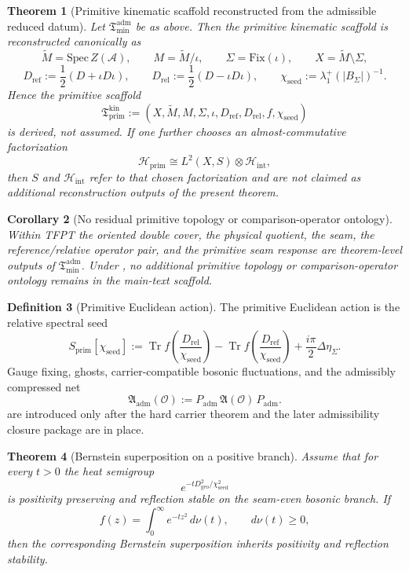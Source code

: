 \documentclass[11pt,a4paper]{article}
\newtheorem{theorem}{Theorem}[section]
\newtheorem{corollary}[theorem]{Corollary}
\theoremstyle{definition}
\newtheorem{definition}[theorem]{Definition}
\theoremstyle{remark}
\DeclareMathOperator{\tr}{Tr}
\newcommand{\Seam}{\Sigma}
\newcommand{\inv}{\iota}
\newcommand{\Hint}{\mathcal H_{\mathrm{int}}}
\newcommand{\Tmin}{\mathfrak T_{\mathrm{min}}}
\newcommand{\Tprim}{\mathfrak T_{\mathrm{prim}}}
\newcommand{\chiseed}{\chi_{\mathrm{seed}}}
\newcommand{\Padm}{P_{\mathrm{adm}}}
\begin{document}
\begin{theorem}[Primitive kinematic scaffold reconstructed from the admissible reduced datum]
\label{thm:primitive-datum-from-reduced-datum}
\label{thm:primitive-scaffold-from-reduced-datum}
Let $\Tmin^{\mathrm{adm}}$ be as above. Then the primitive kinematic scaffold is reconstructed
canonically as
\[
\widetilde M=\mathrm{Spec}\,Z(\mathcal A),\qquad
M=\widetilde M/\inv,\qquad
\Seam=\mathrm{Fix}(\inv),\qquad
X=\widetilde M\setminus \Seam,
\]
\[
D_{\mathrm{ref}}:=\frac12(D+\inv D\inv),\qquad
D_{\mathrm{rel}}:=\frac12(D-\inv D\inv),\qquad
\chiseed:=\lambda_1^+(|B_\Sigma|)^{-1}.
\]
Hence the primitive scaffold
\[
\Tprim^{\mathrm{kin}}
:=
(X,\widetilde M,M,\Seam,\inv,D_{\mathrm{ref}},D_{\mathrm{rel}},f,\chiseed)
\]
is derived, not assumed.
If one further chooses an almost-commutative factorization
\[
\mathcal H_{\mathrm{prim}}\cong L^2(X,S)\otimes \Hint,
\]
then $S$ and $\Hint$ refer to that chosen factorization and are not claimed as
additional reconstruction outputs of the present theorem.
\end{theorem}

\begin{corollary}[No residual primitive topology or comparison-operator ontology]
Within TFPT the oriented double cover, the physical quotient, the seam, the
reference/relative operator pair, and the primitive seam response are theorem-level outputs of
$\Tmin^{\mathrm{adm}}$. Under , no additional
primitive topology or comparison-operator ontology remains in the main-text scaffold.
\end{corollary}

\begin{definition}[Primitive Euclidean action]
The primitive Euclidean action is the relative spectral seed
\[
S_{\mathrm{prim}}[\chiseed]
:=
\tr f\!\left(\frac{D_{\mathrm{rel}}}{\chiseed}\right)
-
\tr f\!\left(\frac{D_{\mathrm{ref}}}{\chiseed}\right)
+\frac{i\pi}{2}\Delta\eta_\Sigma.
\]
Gauge fixing, ghosts, carrier-compatible bosonic fluctuations, and the admissibly compressed net
\[
\mathfrak A_{\mathrm{adm}}(\mathcal O):=
\Padm\,\mathfrak A(\mathcal O)\,\Padm.
\]
are introduced only after the hard carrier theorem and the later admissibility closure package are in place.
\end{definition}

\begin{theorem}[Bernstein superposition on a positive branch]
\label{ass:bernstein-positivity}
Assume that for every $t>0$ the heat semigroup
\[
e^{-tD_{\mathrm{geo}}^2/\chiseed^2}
\]
is positivity preserving and reflection stable on the seam-even bosonic branch.
If
\[
f(z)=\int_0^\infty e^{-tz^2}\,d\nu(t),\qquad d\nu(t)\ge 0,
\]
then the corresponding Bernstein superposition inherits positivity and reflection stability.
\end{theorem}
\end{document}
